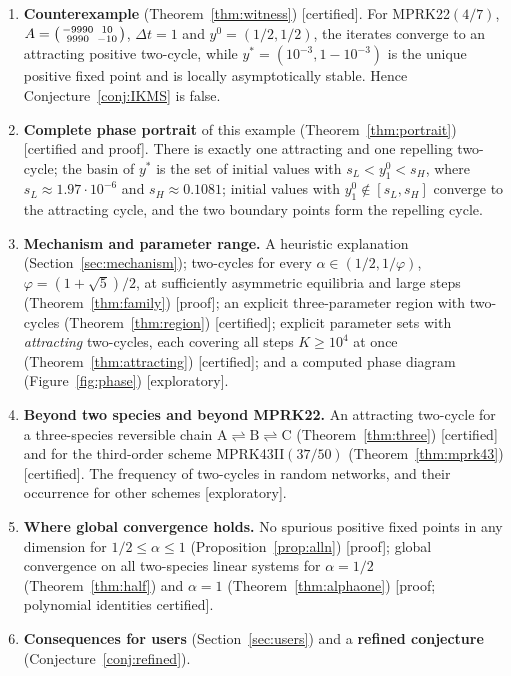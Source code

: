 \documentclass[11pt,a4paper]{article}
\theoremstyle{plain}
\theoremstyle{definition}
\newcommand{\status}[1]{\textsf{[#1]}}
\begin{document}
\begin{enumerate}[leftmargin=*,itemsep=2pt]
\item \textbf{Counterexample} (Theorem~\ref{thm:witness}) \status{certified}. For MPRK22$(4/7)$, $A=\begin{psmallmatrix}-9990&10\\9990&-10\end{psmallmatrix}$, $\Delta t=1$ and $y^0=(1/2,1/2)$, the iterates converge to an attracting positive two-cycle, while $y^*=(10^{-3},1-10^{-3})$ is the unique positive fixed point and is locally asymptotically stable. Hence Conjecture~\ref{conj:IKMS} is false.
\item \textbf{Complete phase portrait} of this example (Theorem~\ref{thm:portrait}) \status{certified and proof}. There is exactly one attracting and one repelling two-cycle; the basin of $y^*$ is the set of initial values with $s_L<y_1^0<s_H$, where $s_L\approx1.97\cdot10^{-6}$ and $s_H\approx0.1081$; initial values with $y_1^0\notin[s_L,s_H]$ converge to the attracting cycle, and the two boundary points form the repelling cycle.
\item \textbf{Mechanism and parameter range.} A heuristic explanation (Section~\ref{sec:mechanism}); two-cycles for every $\alpha\in(1/2,1/\varphi)$, $\varphi=(1+\sqrt5)/2$, at sufficiently asymmetric equilibria and large steps (Theorem~\ref{thm:family}) \status{proof}; an explicit three-parameter region with two-cycles (Theorem~\ref{thm:region}) \status{certified}; explicit parameter sets with \emph{attracting} two-cycles, each covering all steps $K\ge10^4$ at once (Theorem~\ref{thm:attracting}) \status{certified}; and a computed phase diagram (Figure~\ref{fig:phase}) \status{exploratory}.
\item \textbf{Beyond two species and beyond MPRK22.} An attracting two-cycle for a three-species reversible chain $\mathrm A\rightleftharpoons\mathrm B\rightleftharpoons\mathrm C$ (Theorem~\ref{thm:three}) \status{certified} and for the third-order scheme MPRK43II$(37/50)$ (Theorem~\ref{thm:mprk43}) \status{certified}. The frequency of two-cycles in random networks, and their occurrence for other schemes \status{exploratory}.
\item \textbf{Where global convergence holds.} No spurious positive fixed points in any dimension for $1/2\le\alpha\le1$ (Proposition~\ref{prop:alln}) \status{proof}; global convergence on all two-species linear systems for $\alpha=1/2$ (Theorem~\ref{thm:half}) and $\alpha=1$ (Theorem~\ref{thm:alphaone}) \status{proof; polynomial identities certified}.
\item \textbf{Consequences for users} (Section~\ref{sec:users}) and a \textbf{refined conjecture} (Conjecture~\ref{conj:refined}).
\end{enumerate}
\end{document}
